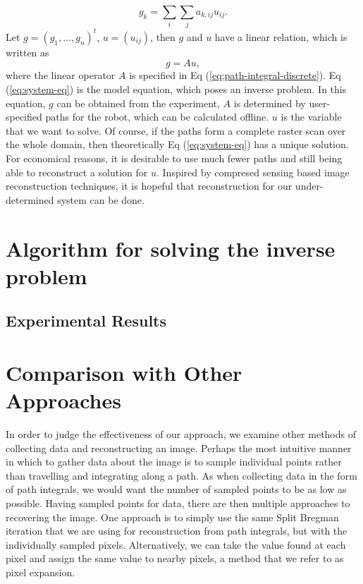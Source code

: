 \documentclass[english]{article}\usepackage[]{graphicx}\usepackage[]{color}
\begin{document}
\begin{equation}
g_{k}=\sum_{i}\sum_{j}a_{k,ij}u_{ij}.\label{eq:path-integral-discrete}
\end{equation}
Let $g=(g_{1},\ldots,g_{n})^{t}$, $u=(u_{ij})$, then $g$ and $u$
have a linear relation, which is written as 
\begin{equation}
g=Au,\label{eq:system-eq}
\end{equation}
where the linear operator $A$ is specified in Eq (\ref{eq:path-integral-discrete}).
Eq (\ref{eq:system-eq}) is the model equation, which poses an inverse
problem. In this equation, $g$ can be obtained from the experiment,
$A$ is determined by user-specified paths for the robot, which can
be calculated offline. $u$ is the variable that we want to solve.
Of course, if the paths form a complete raster scan over the whole
domain, then theoretically Eq (\ref{eq:system-eq}) has a unique solution.
For economical reasons, it is desirable to use much fewer paths and
still being able to reconstruct a solution for $u$. Inspired by compresed
sensing based image reconstruction techniques, it is hopeful that
reconstruction for our under-determined system can be done.

\section{Algorithm for solving the inverse problem}

\subsection{Experimental Results}

\section{Comparison with Other Approaches}

In order to judge the effectiveness of our approach, we examine other methods of collecting data and reconstructing an image. Perhaps the most intuitive manner in which to gather data about the image is to sample individual points rather than travelling and integrating along a path. As when collecting data in the form of path integrals, we would want the number of sampled points to be as low as possible. Having sampled points for data, there are then multiple approaches to recovering the image. One approach is to simply use the same Split Bregman iteration that we are using for reconstruction from path integrals, but with the individually sampled pixels. Alternatively, we can take the value found at each pixel and assign the same value to nearby pixels, a method that we refer to as pixel expansion.
\end{document}

